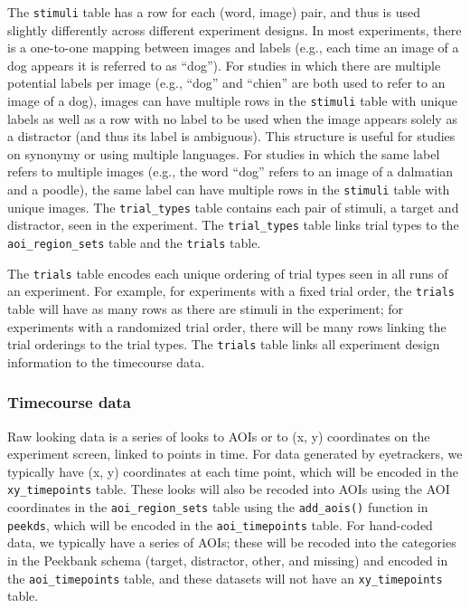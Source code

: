 \documentclass[
  english,
  man,floatsintext]{apa6}
\begin{document}
The \texttt{stimuli} table has a row for each (word, image) pair, and thus is used slightly differently across different experiment designs.
In most experiments, there is a one-to-one mapping between images and labels (e.g., each time an image of a dog appears it is referred to as ``dog'').
For studies in which there are multiple potential labels per image (e.g., ``dog'' and ``chien'' are both used to refer to an image of a dog), images can have multiple rows in the \texttt{stimuli} table with unique labels as well as a row with no label to be used when the image appears solely as a distractor (and thus its label is ambiguous).
This structure is useful for studies on synonymy or using multiple languages.
For studies in which the same label refers to multiple images (e.g., the word ``dog'' refers to an image of a dalmatian and a poodle), the same label can have multiple rows in the \texttt{stimuli} table with unique images.
The \texttt{trial\_types} table contains each pair of stimuli, a target and distractor, seen in the experiment.
The \texttt{trial\_types} table links trial types to the \texttt{aoi\_region\_sets} table and the \texttt{trials} table.

The \texttt{trials} table encodes each unique ordering of trial types seen in all runs of an experiment.
For example, for experiments with a fixed trial order, the \texttt{trials} table will have as many rows as there are stimuli in the experiment; for experiments with a randomized trial order, there will be many rows linking the trial orderings to the trial types.
The \texttt{trials} table links all experiment design information to the timecourse data.

\hypertarget{timecourse-data-1}{%
\subsubsection{Timecourse data}\label{timecourse-data-1}}

Raw looking data is a series of looks to AOIs or to (x, y) coordinates on the experiment screen, linked to points in time.
For data generated by eyetrackers, we typically have (x, y) coordinates at each time point, which will be encoded in the \texttt{xy\_timepoints} table.
These looks will also be recoded into AOIs using the AOI coordinates in the \texttt{aoi\_region\_sets} table using the \texttt{add\_aois()} function in \texttt{peekds}, which will be encoded in the \texttt{aoi\_timepoints} table.
For hand-coded data, we typically have a series of AOIs; these will be recoded into the categories in the Peekbank schema (target, distractor, other, and missing) and encoded in the \texttt{aoi\_timepoints} table, and these datasets will not have an \texttt{xy\_timepoints} table.
\end{document}
